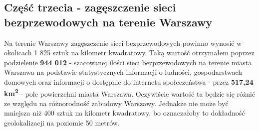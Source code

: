 \subsection{Część trzecia - zagęszczenie sieci bezprzewodowych na terenie Warszawy}
Na terenie Warszawy zagęszczenie sieci bezprzewodowych powinno wynosić w okolicach 1 825 sztuk na kilometr kwadratowy. Taką wartość otrzymałem poprzez podzielenie \textbf{944 012} - szacowanej ilości sieci bezprzewodowych na terenie miasta Warszawa na podstawie statystycznych informacji o ludności, gospodarstwach domowych oraz informacji o dostępnie do internetu społeczeństwa - przez \textbf{517,24 km\textsuperscript{2}} - pole powierzchni miasta Warszawa. Oczywiście wartość ta będzie się różnić ze względu na różnorodność zabudowy Warszawy. Jednakże nie może być mniejsza niż 400 sztuk na kilometr kwadratowy, bo oznaczałoby to dokładność geolokalizacji na poziomie 50 metrów.
